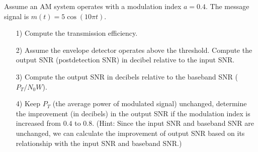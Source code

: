 \documentclass{assignment}
\begin{document}
\begin{prob}
    Assume an AM system operates with a modulation index $a=0.4$. The message signal is $m(t)=5\cos(10\pi t)$.
    \begin{itemize}
        \item[1)] Compute the transmission efficiency.
        \item[2)] Assume the envelope detector operates above the threshold. Compute the output SNR (postdetection SNR) in decibel relative to the input SNR.
        \item[3)] Compute the output SNR in decibels relative to the baseband SNR ($P_T/N_0W$).
        \item[4)] Keep $P_T$ (the average power of modulated signal) unchanged, determine the improvement (in decibels) in the output SNR if the modulation index is increased from $0.4$ to $0.8$. (Hint: Since the input SNR and baseband SNR are unchanged, we can calculate the improvement of output SNR based on its relationship with the input SNR and baseband SNR.)
    \end{itemize}
\end{prob}
\end{document}
